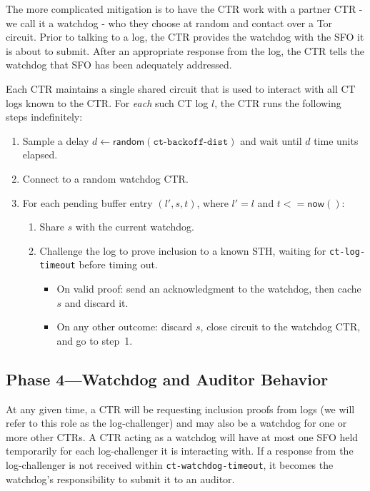 The more complicated mitigation is to have the CTR work with a partner CTR - we call it
a watchdog - who they choose at random and contact over a Tor circuit. Prior to talking
to a log, the CTR provides the watchdog with the SFO it is about to submit. After
an appropriate response from the log, the CTR tells the watchdog that SFO has been
adequately addressed.  

Each CTR maintains a single shared circuit that is used to interact with all CT
logs known to the CTR. For \emph{each} such CT log $l$, the
CTR runs the following steps indefinitely:
\begin{enumerate}
    \item\label{enm:auditing:backoff} Sample a delay $d \gets
        \mathsf{random}(\texttt{ct-backoff-dist})$ and wait until $d$ time units
        elapsed.
    \item Connect to a random watchdog CTR.
    \item\label{enm:auditing:loop} For each pending buffer entry $(l',s,t)$,
    where $l' = l$ and $t <= \mathsf{now}()$:
		\begin{enumerate}
			\item\label{enm:ext:auditing:watchdog} Share $s$ with the current
				watchdog.
			\item\label{enm:ext:auditing:challenge} Challenge the log to prove
                                  inclusion to a known STH, waiting for \texttt{ct-log-timeout} before
                                  timing out.
				\begin{itemize}
					\item\label{enm:ext:auditing:challenge:success} On valid
						proof: send an acknowledgment to the watchdog, then
						cache $s$ and discard it.
					\item\label{enm:ext:auditing:challenge:fail} On any other
						outcome: discard $s$, close circuit to the watchdog CTR,
						and go to step~1.
				\end{itemize}
		\end{enumerate}
\end{enumerate}

\subsection{Phase 4---Watchdog and Auditor Behavior}

At any given time, a CTR will be requesting inclusion proofs from logs (we will refer to this role as the log-challenger) and may also be a watchdog for one or more other CTRs. A CTR acting as a watchdog will have at most one SFO held temporarily for each log-challenger it is interacting with. If a response from the log-challenger is not received within \texttt{ct-watchdog-timeout}, it becomes the watchdog's responsibility to submit it to an auditor.

